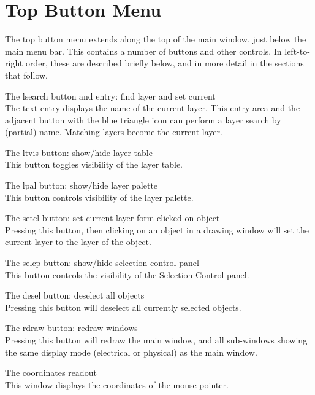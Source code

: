 \section{Top Button Menu}
\label{topbuttons}
The top button menu extends along the top of the {\Xic} main window,
just below the main menu bar.  This contains a number of buttons and
other controls.  In left-to-right order, these are described briefly
below, and in more detail in the sections that follow.

\begin{description}
\item{The {\cb lsearch} button and entry: find layer and set current}\\
The text entry displays the name of the current layer.  This entry
area and the adjacent button with the blue triangle icon can
perform a layer search by (partial) name.  Matching layers become
the current layer.

\item{The {\cb ltvis} button: show/hide layer table}\\
This button toggles visibility of the layer table.

\item{The {\cb lpal} button: show/hide layer palette}\\
This button controls visibility of the layer palette.

\item{The {\cb setcl} button:  set current layer form clicked-on
 object}\\
Pressing this button, then clicking on an object in a
drawing window will set the current layer to the layer of the object.

\item{The {\cb selcp} button: show/hide selection control panel}\\
This button controls the visibility of the {\cb Selection
Control} panel.

\item{The {\cb desel} button: deselect all objects}\\
Pressing this button will deselect all currently selected objects.

\item{The {\cb rdraw} button: redraw windows}\\
Pressing this button will redraw the main window, and all sub-windows
showing the same display mode (electrical or physical) as the main
window.

\item{The coordinates readout}\\
This window displays the coordinates of the mouse pointer.
\end{description}

